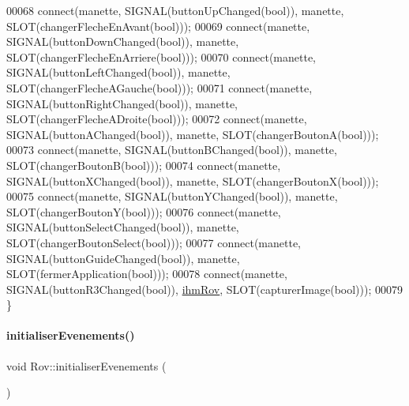 \begin{DoxyCode}
00068     connect(manette, SIGNAL(buttonUpChanged(\textcolor{keywordtype}{bool})), manette, SLOT(changerFlecheEnAvant(\textcolor{keywordtype}{bool})));
00069     connect(manette, SIGNAL(buttonDownChanged(\textcolor{keywordtype}{bool})), manette, SLOT(changerFlecheEnArriere(\textcolor{keywordtype}{bool})));
00070     connect(manette, SIGNAL(buttonLeftChanged(\textcolor{keywordtype}{bool})), manette, SLOT(changerFlecheAGauche(\textcolor{keywordtype}{bool})));
00071     connect(manette, SIGNAL(buttonRightChanged(\textcolor{keywordtype}{bool})), manette, SLOT(changerFlecheADroite(\textcolor{keywordtype}{bool})));
00072     connect(manette, SIGNAL(buttonAChanged(\textcolor{keywordtype}{bool})), manette, SLOT(changerBoutonA(\textcolor{keywordtype}{bool})));
00073     connect(manette, SIGNAL(buttonBChanged(\textcolor{keywordtype}{bool})), manette, SLOT(changerBoutonB(\textcolor{keywordtype}{bool})));
00074     connect(manette, SIGNAL(buttonXChanged(\textcolor{keywordtype}{bool})), manette, SLOT(changerBoutonX(\textcolor{keywordtype}{bool})));
00075     connect(manette, SIGNAL(buttonYChanged(\textcolor{keywordtype}{bool})), manette, SLOT(changerBoutonY(\textcolor{keywordtype}{bool})));
00076     connect(manette, SIGNAL(buttonSelectChanged(\textcolor{keywordtype}{bool})), manette, SLOT(changerBoutonSelect(\textcolor{keywordtype}{bool})));
00077     connect(manette, SIGNAL(buttonGuideChanged(\textcolor{keywordtype}{bool})), manette, SLOT(fermerApplication(\textcolor{keywordtype}{bool})));
00078     connect(manette, SIGNAL(buttonR3Changed(\textcolor{keywordtype}{bool})), \hyperlink{class_rov_a9b1c1c3b4e268a32e69b2ea4c863b817}{ihmRov}, SLOT(capturerImage(\textcolor{keywordtype}{bool})));
00079 \}
\end{DoxyCode}
\mbox{\label{class_rov_a3ba4939b5d1cbd837b9c42869e6b8114}} 
\paragraph{\texorpdfstring{initialiser\+Evenements()}{initialiserEvenements()}}
{\footnotesize\ttfamily void Rov\+::initialiser\+Evenements (\begin{DoxyParamCaption}{ }\end{DoxyParamCaption})\hspace{0.3cm}{\ttfamily [private]}}




